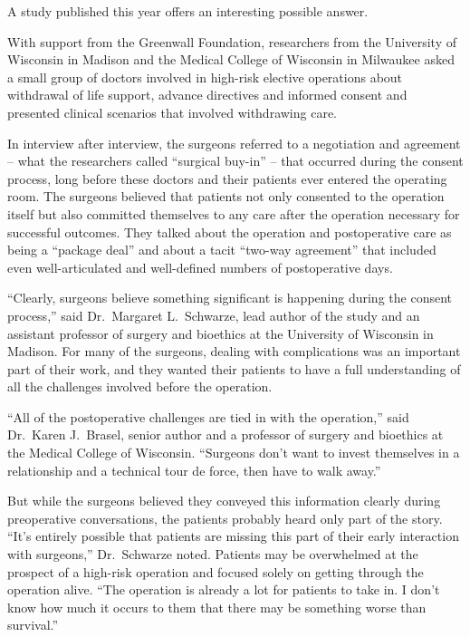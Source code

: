 ﻿\documentclass[12pt]{article}
\begin{document}
A study published this year offers an interesting possible answer.

With support from the Greenwall Foundation, researchers from the University of Wisconsin in Madison
and the Medical College of Wisconsin in Milwaukee asked a small group of doctors involved in
high-risk elective operations about withdrawal of life support, advance directives and informed
consent and presented clinical scenarios that involved withdrawing care.

In interview after interview, the surgeons referred to a negotiation and agreement -- what the
researchers called ``surgical buy-in'' -- that occurred during the consent process, long before
these doctors and their patients ever entered the operating room. The surgeons believed that
patients not only consented to the operation itself but also committed themselves to any care after
the operation necessary for successful outcomes. They talked about the operation and postoperative
care as being a ``package deal'' and about a tacit ``two-way agreement'' that included even
well-articulated and well-defined numbers of postoperative days.

``Clearly, surgeons believe something significant is happening during the consent process,'' said
Dr.~Margaret L.~Schwarze, lead author of the study and an assistant professor of surgery and
bioethics at the University of Wisconsin in Madison. For many of the surgeons, dealing with
complications was an important part of their work, and they wanted their patients to have a full
understanding of all the challenges involved before the operation.

``All of the postoperative challenges are tied in with the operation,'' said Dr.~Karen J.~Brasel,
senior author and a professor of surgery and bioethics at the Medical College of Wisconsin.
``Surgeons don't want to invest themselves in a relationship and a technical tour de force, then
have to walk away.''

But while the surgeons believed they conveyed this information clearly during preoperative
conversations, the patients probably heard only part of the story. ``It's entirely possible that
patients are missing this part of their early interaction with surgeons,'' Dr.~Schwarze noted.
Patients may be overwhelmed at the prospect of a high-risk operation and focused solely on getting
through the operation alive. ``The operation is already a lot for patients to take in. I don't know
how much it occurs to them that there may be something worse than survival.''
\end{document}
